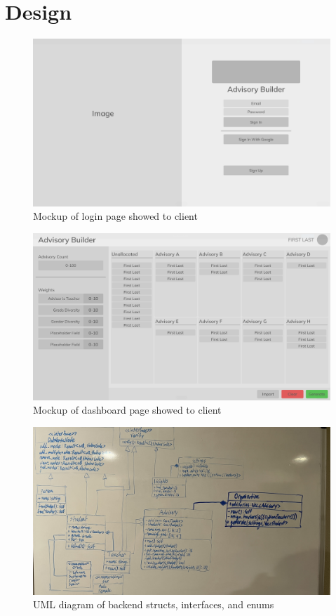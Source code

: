 \documentclass{paper}
\begin{document}
\section{Design}
\label{sec:design}
\begin{figure}
  \includegraphics[width=\linewidth]{Login-Mockup}
  \caption{Mockup of login page showed to client}
\end{figure}
\begin{figure}
  \includegraphics[width=\linewidth]{Dashboard-Mockup}
  \caption{Mockup of dashboard page showed to client}
\end{figure}
\begin{figure}
  \includegraphics[width=\linewidth]{UML}
  \caption{UML diagram of backend structs, interfaces, and enums}
\end{figure}
\end{document}
